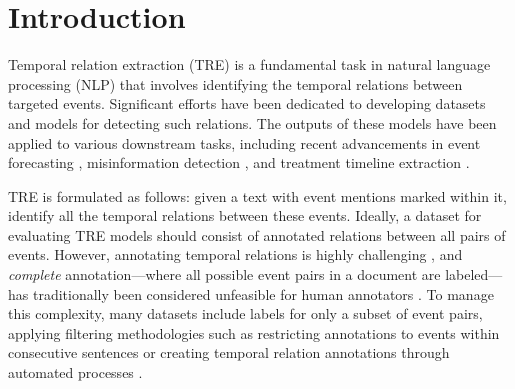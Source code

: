 \section{Introduction}
\label{intro}
Temporal relation extraction (TRE) is a fundamental task in natural language processing (NLP) that involves identifying the temporal relations between targeted events. Significant efforts have been dedicated to developing datasets \cite{gast-etal-2016-enriching, rogers-etal-2024-narrativetime} and models \cite{huang-etal-2023-classification, niu-etal-2024-contempo} for detecting such relations. The outputs of these models have been applied to various downstream tasks, including recent advancements in event forecasting \cite{Ma2023ContextawareEF}, misinformation detection \cite{lei-huang-2023-identifying}, and treatment timeline extraction \cite{yao-etal-2024-overview}.


TRE is formulated as follows: given a text with event mentions marked within it, identify all the temporal relations between these events. Ideally, a dataset for evaluating TRE models should consist of annotated relations between all pairs of events. However, annotating temporal relations is highly challenging \cite{pustejovsky-stubbs-2011-increasing}, and \textit{complete} annotation—where all possible event pairs in a document are labeled—has traditionally been considered unfeasible for human annotators \cite{naik-etal-2019-tddiscourse}. To manage this complexity, many datasets include labels for only a subset of event pairs, applying filtering methodologies such as restricting annotations to events within consecutive sentences \cite{chambers-etal-2014-dense} or creating temporal relation annotations through automated processes \cite{alsayyahi-batista-navarro-2023-timeline}.

